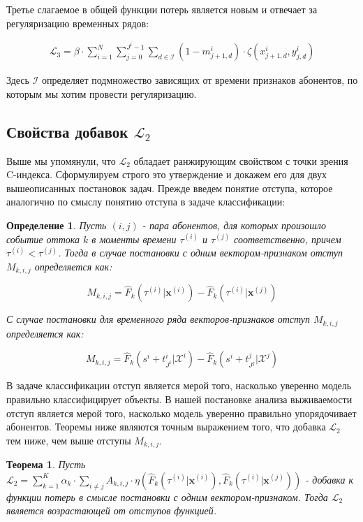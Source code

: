 \documentclass{article}
\newtheorem{theorem}{Теорема}
\newtheorem{definition}{Определение}
\begin{document}
Третье слагаемое в общей функции потерь является новым и отвечает за регуляризацию временных рядов: 

\begin{equation}
	\begin{aligned}
		\mathcal{L}_3=\beta\cdot\sum_{i=1}^N\sum_{j=0}^{J^i-1}\sum_{d\in\mathcal{I}}(1-m_{j+1,d}^i)\cdot\zeta(x_{j+1,d}^i,y_{j,d}^i)	
	\end{aligned}
\end{equation}		

Здесь $\mathcal{I}$ определяет подмножество зависящих от времени признаков абонентов, по которым мы хотим провести регуляризацию. 

\subsection{Свойства добавок $\mathcal{L}_2$}

Выше мы упомянули, что $\mathcal{L}_2$ обладает ранжирующим свойством с точки зрения C-индекса. Сформулируем строго это утверждение и докажем его для двух вышеописанных постановок задач. Прежде введем понятие отступа, которое аналогично по смыслу понятию отступа в задаче классификации: 

\begin{definition}
Пусть $(i,j)$ - пара абонентов, для которых произошло событие оттока $k$ в моменты времени $\tau^{(i)}$ и $\tau^{(j)}$ соответственно, причем $\tau^{(i)} < \tau^{(j)}$. Тогда в случае постановки с одним вектором-признаком отступ $M_{k,i,j}$ определяется как: 

$$M_{k,i,j} = \hat{F}_k(\tau^{(i)}|\mathbf{x}^{(i)}) - \hat{F}_k(\tau^{(i)}|\mathbf{x}^{(j)}) $$ 

С случае постановки для временного ряда векторов-признаков отступ $M_{k,i,j}$ определяется как:

$$M_{k,i,j} = \hat{F}_k(s^i+t_{J^i}^i|\mathcal{X}^i) - \hat{F}_k(s^i+t_{J^j}^j|\mathcal{X}^j)$$

\end{definition}

В задаче классификации отступ является мерой того, насколько уверенно модель правильно классифицирует объекты. В нашей постановке анализа выживаемости отступ является мерой того, насколько модель уверенно правильно упорядочивает абонентов. Теоремы ниже являются точным выражением того, что добавка $\mathcal{L}_2$ тем ниже, чем выше отступы $M_{k,i,j}$. 

\begin{theorem}
	Пусть $\mathcal{L}_2 =\sum_{k=1}^K\alpha_k\cdot\sum_{i\neq j}A_{k,i,j}\cdot\eta\left(\hat{F}_k(\tau^{(i)}|\mathbf{x}^{(i)}),\hat{F}_k(\tau^{(i)}|\mathbf{x}^{(j)})\right)$ - добавка к функции потерь в смысле постановки с одним вектором-признаком. Тогда $\mathcal{L}_2$ является возрастающей от отступов функцией.  
\end{theorem}
\end{document}
